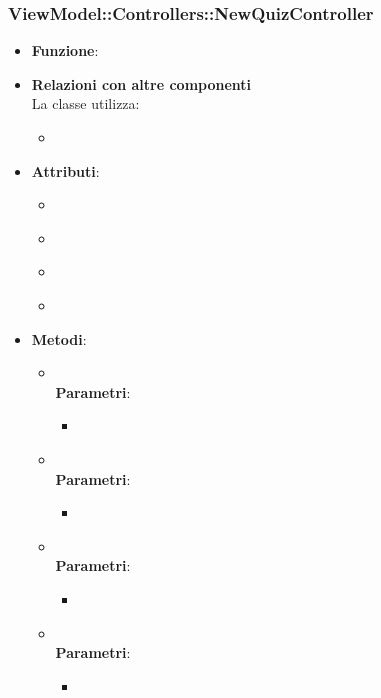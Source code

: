 \subsubsection{ViewModel::Controllers::NewQuizController}
\begin{itemize}
\item\textbf{Funzione}:
\item\textbf{Relazioni con altre componenti}\\
La classe utilizza:
	\begin{itemize}
		\item
	\end{itemize}
\item\textbf{Attributi}:
	\begin{itemize}
		\item\code{}\\
		\item\code{}\\
		\item\code{}\\
		\item\code{}\\
	\end{itemize}
\item\textbf{Metodi}:
	\begin{itemize}
		\item\code{}\\
		\textbf{Parametri}:
			\begin{itemize}
				\item\code{}\\
			\end{itemize}
		\item\code{}\\
		\textbf{Parametri}:
			\begin{itemize}
				\item\code{}\\
			\end{itemize}
		\item\code{}\\
		\textbf{Parametri}:
			\begin{itemize}
				\item\code{}\\
			\end{itemize}
		\item\code{}\\
		\textbf{Parametri}:
			\begin{itemize}
				\item\code{}\\
			\end{itemize}
	\end{itemize}
\end{itemize}

